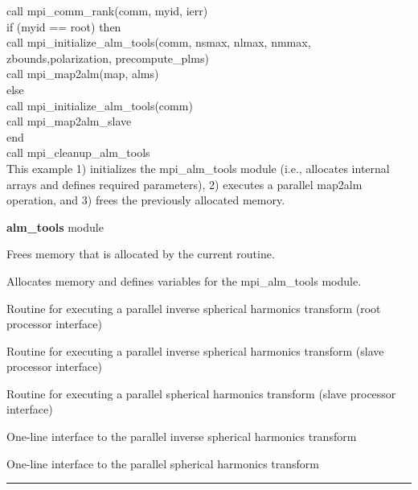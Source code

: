 \begin{example}
{
call mpi\_comm\_rank(comm, myid, ierr)\\
if (myid == root) then\\
\hspace*{1cm}call mpi\_initialize\_alm\_tools(comm, nsmax, nlmax, nmmax, \\
\hspace*{3cm}zbounds,polarization, precompute\_plms)\\
\hspace*{1cm}call mpi\_map2alm(map, alms)\\
else \\
\hspace*{1cm}call mpi\_initialize\_alm\_tools(comm)\\
\hspace*{1cm}call mpi\_map2alm\_slave\\
end\\
call mpi\_cleanup\_alm\_tools\\
}
{
This example 1) initializes the mpi\_alm\_tools module (i.e.,
allocates internal arrays and defines required parameters), 2)
executes a parallel map2alm operation, and 3) frees the previously
allocated memory.
}
\end{example}

\begin{modules}
  \begin{sulist}{} %
  \item[\textbf{alm\_tools}] module
  \end{sulist}
\end{modules}

\begin{related}
  \begin{sulist}{} %
   \item[\htmlref{mpi\_cleanup\_alm\_tools}{sub:mpi_cleanup_alm_tools}] Frees memory that is allocated by the current routine. 
   \item[\htmlref{mpi\_initialize\_alm\_tools}{sub:mpi_initialize_alm_tools}] Allocates memory and defines variables for the mpi\_alm\_tools module. 
  \item[\htmlref{mpi\_alm2map}{sub:mpi_alm2map}] Routine for executing a parallel inverse spherical harmonics transform (root processor interface)
  \item[\htmlref{mpi\_alm2map\_slave}{sub:mpi_alm2map_slave}] Routine for executing a parallel inverse spherical harmonics transform (slave processor interface)
  \item[\htmlref{mpi\_map2alm\_slave}{sub:mpi_map2alm_slave}] Routine for executing a parallel spherical harmonics transform (slave processor interface)
  \item[\htmlref{mpi\_alm2map\_simple}{sub:mpi_alm2map_simple}] One-line interface to the parallel inverse spherical harmonics transform 
  \item[\htmlref{mpi\_map2alm\_simple}{sub:mpi_map2alm_simple}] One-line interface to the parallel spherical harmonics transform 
  \end{sulist}
\end{related}

\rule{\hsize}{2mm}

\newpage
